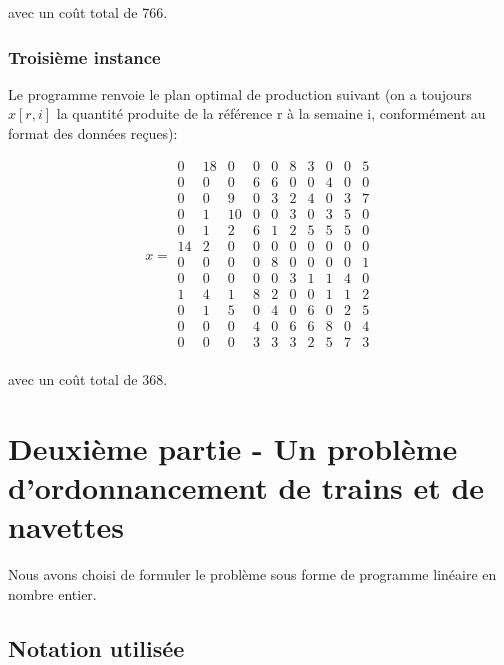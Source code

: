 \documentclass{rapport}
\begin{document}
avec un coût total de 766.

\subsubsection{Troisième instance}
Le programme renvoie le plan optimal de production suivant (on a toujours $x[r,i]$ la quantité produite de la référence r à la semaine i, conformément au format des données reçues):

\[x=
\begin{matrix}
0 & 18 & 0 & 0 & 0 & 8 & 3 & 0 & 0 & 5 \\
0 & 0 & 0 & 6 & 6 & 0 & 0 & 4 & 0 & 0 \\
0 & 0 & 9 & 0 & 3 & 2 & 4 & 0 & 3 & 7 \\
0 & 1 & 10 & 0 & 0 & 3 & 0 & 3 & 5 & 0 \\
0 & 1 & 2 & 6 & 1 & 2 & 5 & 5 & 5 & 0 \\
14 & 2 & 0 & 0 & 0 & 0 & 0 & 0 & 0 & 0 \\
0 & 0 & 0 & 0 & 8 & 0 & 0 & 0 & 0 & 1 \\
0 & 0 & 0 & 0 & 0 & 3 & 1 & 1 & 4 & 0 \\
1 & 4 & 1 & 8 & 2 & 0 & 0 & 1 & 1 & 2 \\
0 & 1 & 5 & 0 & 4 & 0 & 6 & 0 & 2 & 5 \\
0 & 0 & 0 & 4 & 0 & 6 & 6 & 8 & 0 & 4 \\
0 & 0 & 0 & 3 & 3 & 3 & 2 & 5 & 7 & 3 \\
\end{matrix}
\]

avec un coût total de 368.

\section{Deuxième partie - Un problème d'ordonnancement de trains et de navettes}

Nous avons choisi de formuler le problème sous forme de programme linéaire en nombre entier.

\subsection{Notation utilisée}
\end{document}

